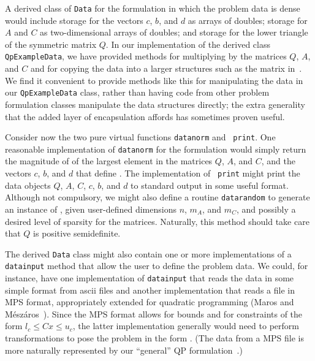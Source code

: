 A derived class of {\tt Data} for the formulation  in which
the problem data is dense would include storage for the vectors $c$,
$b$, and $d$ as arrays of doubles; storage for $A$ and $C$ as
two-dimensional arrays of doubles; and storage for the lower triangle
of the symmetric matrix $Q$. In our implementation of the derived
class \texttt{QpExampleData}, we have provided methods for multiplying
by the matrices $Q$, $A$, and $C$ and for copying the data into a
larger structures such as the matrix in~. We find
it convenient to provide methods like this for manipulating the data
in our \texttt{QpExampleData} class, rather than having code from
other problem formulation classes manipulate the data structures
directly; the extra generality that the added layer of encapsulation
affords has sometimes proven useful.


Consider now the two pure virtual functions {\tt datanorm} and {\tt
print}. One reasonable implementation of {\tt datanorm} for the
formulation  would simply return the magnitude of of the
largest element in the matrices $Q$, $A$, and $C$, and the vectors
$c$, $b$, and $d$ that define .  The implementation of {\tt
print} might print the data objects $Q$, $A$, $C$, $c$, $b$, and $d$
to standard output in some useful format. Although not compulsory, we
might also define a routine {\tt datarandom} to generate an instance
of , given user-defined dimensions $n$, $m_A$, and $m_C$,
and possibly a desired level of sparsity for the matrices.  Naturally,
this method should take care that $Q$ is positive semidefinite.

The derived {\tt Data} class might also contain one or more
implementations of a {\tt datainput} method that allow the user to
define the problem data. We could, for instance, have one implementation
of {\tt datainput} that reads the data in some simple format from
ascii files and another implementation that reads a file in MPS
format, appropriately extended for quadratic programming (Maros and
M\'esz\'aros~\cite{MarM99}). Since the MPS format allows for bounds
and for constraints of the form $l_c \le C x \le u_c$, the latter
implementation generally would need to perform transformations to pose
the problem in the form . (The data from a MPS file is more
naturally represented by our ``general'' QP formulation~.)

